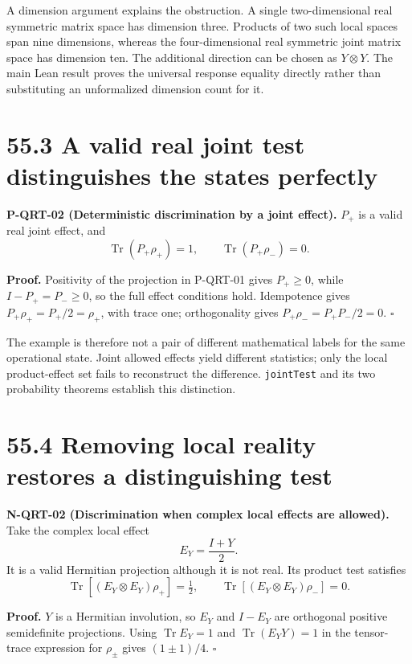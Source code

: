 \documentclass[
  11pt,
  oneside]{book}
\begin{document}
A dimension argument explains the obstruction. A single two-dimensional
real symmetric matrix space has dimension three. Products of two such
local spaces span nine dimensions, whereas the four-dimensional real
symmetric joint matrix space has dimension ten. The additional direction
can be chosen as \(Y\otimes Y\). The main Lean result proves the
universal response equality directly rather than substituting an
unformalized dimension count for it.

\section{55.3 A valid real joint test distinguishes the states
perfectly}

\label{p-qrt-02}{}

\textbf{P-QRT-02 (Deterministic discrimination by a joint effect).}
\(P_+\) is a valid real joint effect, and \[
\operatorname{Tr}(P_+\rho_+)=1,\qquad
\operatorname{Tr}(P_+\rho_-)=0.
\]

\textbf{Proof.} Positivity of the projection in P-QRT-01 gives
\(P_+\ge0\), while \(I-P_+=P_-\ge0\), so the full effect conditions
hold. Idempotence gives \(P_+\rho_+=P_+/2=\rho_+\), with trace one;
orthogonality gives \(P_+\rho_-=P_+P_-/2=0\). \(\square\)

The example is therefore not a pair of different mathematical labels for
the same operational state. Joint allowed effects yield different
statistics; only the local product-effect set fails to reconstruct the
difference. \texttt{joint\allowbreak Test} and its two probability theorems
establish this distinction.

\section{55.4 Removing local reality restores a distinguishing test}

\label{n-qrt-02}{}

\textbf{N-QRT-02 (Discrimination when complex local effects are
allowed).} Take the complex local effect \[
E_Y=\frac{I+Y}{2}.
\] It is a valid Hermitian projection although it is not real. Its
product test satisfies \[
\operatorname{Tr}[(E_Y\otimes E_Y)\rho_+]=\tfrac12,
\qquad \operatorname{Tr}[(E_Y\otimes E_Y)\rho_-]=0.
\]

\textbf{Proof.} \(Y\) is a Hermitian involution, so \(E_Y\) and
\(I-E_Y\) are orthogonal positive semidefinite projections. Using
\(\operatorname{Tr}E_Y=1\) and \(\operatorname{Tr}(E_YY)=1\) in the
tensor-trace expression for \(\rho_\pm\) gives \((1\pm1)/4\).
\(\square\)
\end{document}
